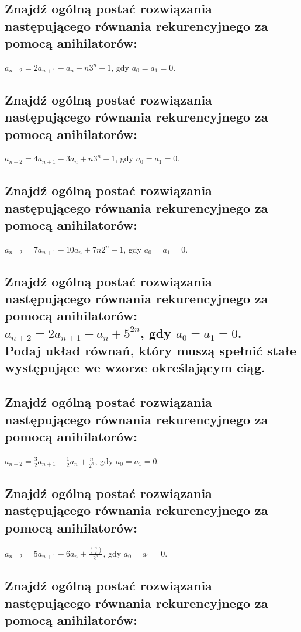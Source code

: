 \documentclass[12pt]{article}
\begin{document}
\subsection{Znajdź ogólną postać rozwiązania następującego równania rekurencyjnego za pomocą anihilatorów:}
$a_{n+2} = 2a_{n+1} - a_n + n3^n - 1$, gdy $a_0 = a_1 = 0$.

\subsection{Znajdź ogólną postać rozwiązania następującego równania rekurencyjnego za pomocą anihilatorów:}
$a_{n+2} = 4a_{n+1} - 3a_n + n3^n - 1$, gdy $a_0 = a_1 = 0$.

\subsection{Znajdź ogólną postać rozwiązania następującego równania rekurencyjnego za pomocą anihilatorów:}
$a_{n+2} = 7a_{n+1} - 10a_n + 7n2^n - 1$, gdy $a_0 = a_1 = 0$.

\subsection{Znajdź ogólną postać rozwiązania następującego równania rekurencyjnego za pomocą anihilatorów:\\$a_{n+2} = 2a_{n+1} - a_n + 5^{2n}$, gdy $a_0 = a_1 = 0$. \\Podaj układ równań, który muszą spełnić stałe występujące we wzorze określającym ciąg.}

\subsection{Znajdź ogólną postać rozwiązania następującego równania rekurencyjnego za pomocą anihilatorów:}
$a_{n+2} = \frac{3}{2}a_{n+1} - \frac{1}{2}a_n + \frac{n}{2^n}$, gdy $a_0 = a_1 = 0$.

\subsection{Znajdź ogólną postać rozwiązania następującego równania rekurencyjnego za pomocą anihilatorów:}
$a_{n+2} = 5a_{n+1} - 6a_n + \frac{{n \choose 2}}{2^n}$, gdy $a_0 = a_1 = 0$.

\subsection{Znajdź ogólną postać rozwiązania następującego równania rekurencyjnego za pomocą anihilatorów:}
\end{document}
